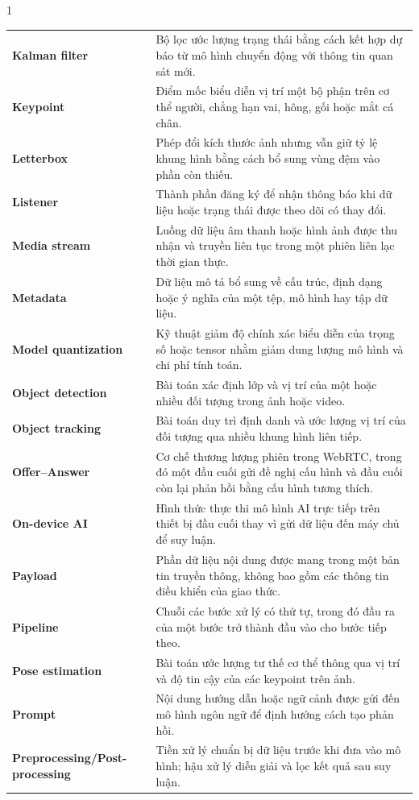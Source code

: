 \begin{spacing}{1}
\begin{longtable}{@{}>{\bfseries\color{HCMUTDarkBlue}}p{4.1cm}p{10.7cm}@{}}
  Kalman filter
    & Bộ lọc ước lượng trạng thái bằng cách kết hợp dự báo từ mô hình chuyển động với thông tin quan sát mới. \\
  Keypoint
    & Điểm mốc biểu diễn vị trí một bộ phận trên cơ thể người, chẳng hạn vai, hông, gối hoặc mắt cá chân. \\
  Letterbox
    & Phép đổi kích thước ảnh nhưng vẫn giữ tỷ lệ khung hình bằng cách bổ sung vùng đệm vào phần còn thiếu. \\
  Listener
    & Thành phần đăng ký để nhận thông báo khi dữ liệu hoặc trạng thái được theo dõi có thay đổi. \\
  Media stream
    & Luồng dữ liệu âm thanh hoặc hình ảnh được thu nhận và truyền liên tục trong một phiên liên lạc thời gian thực. \\
  Metadata
    & Dữ liệu mô tả bổ sung về cấu trúc, định dạng hoặc ý nghĩa của một tệp, mô hình hay tập dữ liệu. \\
  Model quantization
    & Kỹ thuật giảm độ chính xác biểu diễn của trọng số hoặc tensor nhằm giảm dung lượng mô hình và chi phí tính toán. \\
  Object detection
    & Bài toán xác định lớp và vị trí của một hoặc nhiều đối tượng trong ảnh hoặc video. \\
  Object tracking
    & Bài toán duy trì định danh và ước lượng vị trí của đối tượng qua nhiều khung hình liên tiếp. \\
  Offer--Answer
    & Cơ chế thương lượng phiên trong WebRTC, trong đó một đầu cuối gửi đề nghị cấu hình và đầu cuối còn lại phản hồi bằng cấu hình tương thích. \\
  On-device AI
    & Hình thức thực thi mô hình AI trực tiếp trên thiết bị đầu cuối thay vì gửi dữ liệu đến máy chủ để suy luận. \\
  Payload
    & Phần dữ liệu nội dung được mang trong một bản tin truyền thông, không bao gồm các thông tin điều khiển của giao thức. \\
  Pipeline
    & Chuỗi các bước xử lý có thứ tự, trong đó đầu ra của một bước trở thành đầu vào cho bước tiếp theo. \\
  Pose estimation
    & Bài toán ước lượng tư thế cơ thể thông qua vị trí và độ tin cậy của các keypoint trên ảnh. \\
  Prompt
    & Nội dung hướng dẫn hoặc ngữ cảnh được gửi đến mô hình ngôn ngữ để định hướng cách tạo phản hồi. \\
  Preprocessing/Post-processing
    & Tiền xử lý chuẩn bị dữ liệu trước khi đưa vào mô hình; hậu xử lý diễn giải và lọc kết quả sau suy luận. \\

\end{longtable}
\end{spacing}
